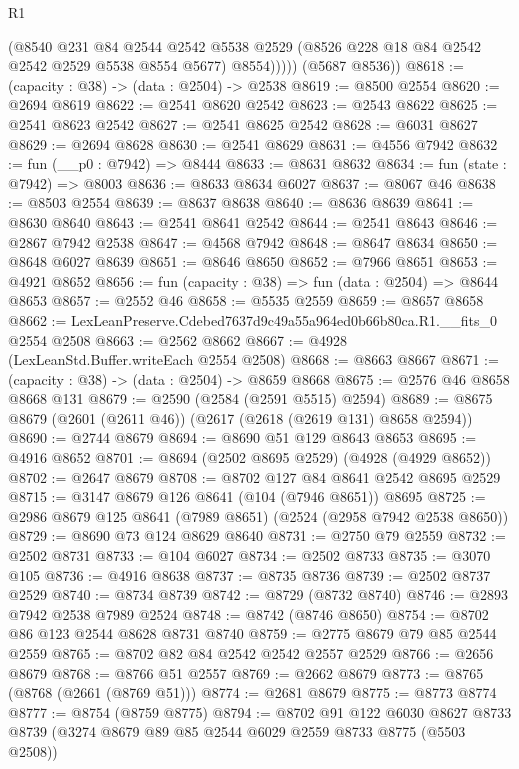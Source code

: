 \begin{lexlean}{R1}
\begin{coremodule}
              (@8540
                @231
                @84
                @2544
                @2542
                @5538
                @2529
                (@8526 @228 @18 @84 @2542 @2542 @2529 @5538 @8554 @5677)
                @8554)))))
      (@5687 @8536))
@8618 := (capacity : @38) -> (data : @2504) -> @2538
@8619 := @8500 @2554
@8620 := @2694 @8619
@8622 := @2541 @8620 @2542
@8623 := @2543 @8622
@8625 := @2541 @8623 @2542
@8627 := @2541 @8625 @2542
@8628 := @6031 @8627
@8629 := @2694 @8628
@8630 := @2541 @8629
@8631 := @4556 @7942
@8632 := fun (__p0 : @7942) => @8444
@8633 := @8631 @8632
@8634 := fun (state : @7942) => @8003
@8636 := @8633 @8634 @6027
@8637 := @8067 @46
@8638 := @8503 @2554
@8639 := @8637 @8638
@8640 := @8636 @8639
@8641 := @8630 @8640
@8643 := @2541 @8641 @2542
@8644 := @2541 @8643
@8646 := @2867 @7942 @2538
@8647 := @4568 @7942
@8648 := @8647 @8634
@8650 := @8648 @6027 @8639
@8651 := @8646 @8650
@8652 := @7966 @8651
@8653 := @4921 @8652
@8656 := fun (capacity : @38) => fun (data : @2504) => @8644 @8653
@8657 := @2552 @46
@8658 := @5535 @2559
@8659 := @8657 @8658
@8662 := LexLeanPreserve.Cdebed7637d9c49a55a964ed0b66b80ca.R1.__fits_0 @2554 @2508
@8663 := @2562 @8662
@8667 := @4928 (LexLeanStd.Buffer.writeEach @2554 @2508)
@8668 := @8663 @8667
@8671 := (capacity : @38) -> (data : @2504) -> @8659 @8668
@8675 := @2576 @46 @8658 @8668 @131
@8679 := @2590 (@2584 (@2591 @5515) @2594)
@8689 := @8675 @8679 (@2601 (@2611 @46)) (@2617 (@2618 (@2619 @131) @8658 @2594))
@8690 := @2744 @8679
@8694 := @8690 @51 @129 @8643 @8653
@8695 := @4916 @8652
@8701 := @8694 (@2502 @8695 @2529) (@4928 (@4929 @8652))
@8702 := @2647 @8679
@8708 := @8702 @127 @84 @8641 @2542 @8695 @2529
@8715 := @3147 @8679 @126 @8641 (@104 (@7946 @8651)) @8695
@8725 := @2986 @8679 @125 @8641 (@7989 @8651) (@2524 (@2958 @7942 @2538 @8650))
@8729 := @8690 @73 @124 @8629 @8640
@8731 := @2750 @79 @2559
@8732 := @2502 @8731
@8733 := @104 @6027
@8734 := @2502 @8733
@8735 := @3070 @105
@8736 := @4916 @8638
@8737 := @8735 @8736
@8739 := @2502 @8737 @2529
@8740 := @8734 @8739
@8742 := @8729 (@8732 @8740)
@8746 := @2893 @7942 @2538 @7989 @2524
@8748 := @8742 (@8746 @8650)
@8754 := @8702 @86 @123 @2544 @8628 @8731 @8740
@8759 := @2775 @8679 @79 @85 @2544 @2559
@8765 := @8702 @82 @84 @2542 @2542 @2557 @2529
@8766 := @2656 @8679
@8768 := @8766 @51 @2557
@8769 := @2662 @8679
@8773 := @8765 (@8768 (@2661 (@8769 @51)))
@8774 := @2681 @8679
@8775 := @8773 @8774
@8777 := @8754 (@8759 @8775)
@8794 := @8702
    @91
    @122
    @6030
    @8627
    @8733
    @8739
    (@3274 @8679 @89 @85 @2544 @6029 @2559 @8733 @8775 (@5503 @2508))

\end{coremodule}
\end{lexlean}
